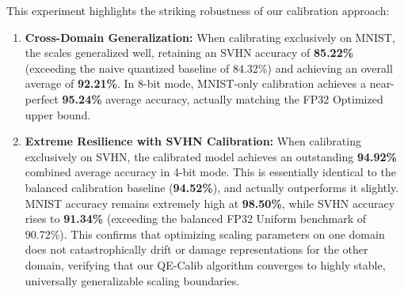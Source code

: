 This experiment highlights the striking robustness of our calibration approach:
\begin{enumerate}
    \item \textbf{Cross-Domain Generalization:} When calibrating exclusively on MNIST, the scales generalized well, retaining an SVHN accuracy of \textbf{85.22\%} (exceeding the naive quantized baseline of 84.32\%) and achieving an overall average of \textbf{92.21\%}. In 8-bit mode, MNIST-only calibration achieves a near-perfect \textbf{95.24\%} average accuracy, actually matching the FP32 Optimized upper bound.
    \item \textbf{Extreme Resilience with SVHN Calibration:} When calibrating exclusively on SVHN, the calibrated model achieves an outstanding \textbf{94.92\%} combined average accuracy in 4-bit mode. This is essentially identical to the balanced calibration baseline (\textbf{94.52\%}), and actually outperforms it slightly. MNIST accuracy remains extremely high at \textbf{98.50\%}, while SVHN accuracy rises to \textbf{91.34\%} (exceeding the balanced FP32 Uniform benchmark of 90.72\%). This confirms that optimizing scaling parameters on one domain does not catastrophically drift or damage representations for the other domain, verifying that our QE-Calib algorithm converges to highly stable, universally generalizable scaling boundaries.
\end{enumerate}
